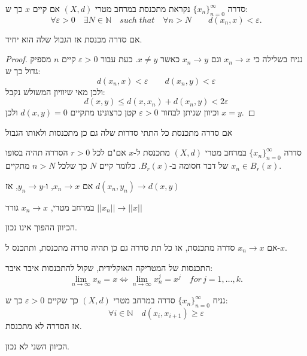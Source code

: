 \documentclass{tstextbook}
\begin{document}
\begin{definition}
סדרה \(\{ x_n\}_{n=0}^{\infty}\) נקראת מתכנסת במרחב מטרי \((X,d)\) אם קיים \(x\) כך ש:
$$\forall\varepsilon>0\quad\exists N\in\mathbb{N}\quad s u c h\;t h a t\quad\forall n>N\qquad d(x_{n},x)<\varepsilon.$$

\end{definition}
\begin{proposition}
אם סדרה מכנסת אז הגבול שלה הוא יחיד.

\end{proposition}
\begin{proof}
נניח בשלילה כי \(x_{n}\to x\) וגם \(x_{n}\to y\) כאשר \(x\neq y\). כעת עבור \(\varepsilon>0\) קיים \(n\) מספיק גדול כך ש:
$$d(x_{n},x)<\varepsilon \qquad d(x_{n},y)<\varepsilon$$
ולכן מאי שיוויון המשולש נקבל:
$$d(x,y)\leq d(x,x_{n})+d(x_{n},y)<2\varepsilon$$
וכיוון שניתן לבחור \(\varepsilon>0\) קטן כרצונינו מתקיים \(d(x,y)=0\) ולכן \(x=y\).

\end{proof}
\begin{proposition}
אם סדרה מתכנסת כל התתי סדרות שלה גם כן מתכנסות ולאותו הגבול

\end{proposition}
\begin{proposition}
סדרה \(\{ x_n\}_{n=0}^{\infty}\) במרחב מטרי \((X,d)\) מתכנסת ל-\(x\) אם"ם לכל \(r>0\) הסדרה תהיה בסופו של דבר חסומה ב-\(B_{r}(x)\). כלומר קיים \(N\) כך שלכל \(n>N\) מתקיים \(x_{n}\in B_{r}(x)\).

\end{proposition}
\begin{proposition}
אם \(x_{n}\to x\), ו-\(y_{n}\to y\), אז \(d(x_{n},y_{n})\to d(x,y)\)

\end{proposition}
\begin{corollary}
במרחב מטרי, \(x_{n}\to x\) גורר \(||x_{n}||\to ||x||\)

\end{corollary}
\begin{remark}
הכיוון ההפוך אינו נכון.

\end{remark}
\begin{proposition}
אם \(x_{n}\to x\) סדרה מתכנסת, אז כל תת סדרה גם כן תהיה סדרה מתכנסת, ותתכנס ל-\(x\).

\end{proposition}
\begin{proposition}
התכנסות של המטריקה האוקלידית, שקול להתכנסות איבר איבר:
$$\operatorname*{lim}_{n\to\infty}x_{n}=x \iff\operatorname*{lim}_{n\to\infty}x_{n}^{j}=x^{j}\quad f o r\,j=1,\ldots,k.$$

\end{proposition}
\begin{proposition}
נניח \(\{ x_n\}_{n=0}^{\infty}\) סדרה במרחב מטרי \((X,d)\) כך שקיים \(\varepsilon>0\) כך ש:
$$\forall i\in \mathbb{N}\quad d\left( x_{i},x_{i+1} \right)\geq\varepsilon$$
אז הסדרה לא מתכנסת.

\end{proposition}
\begin{remark}
הכיוון השני לא נכון.

\end{remark}
\end{document}

